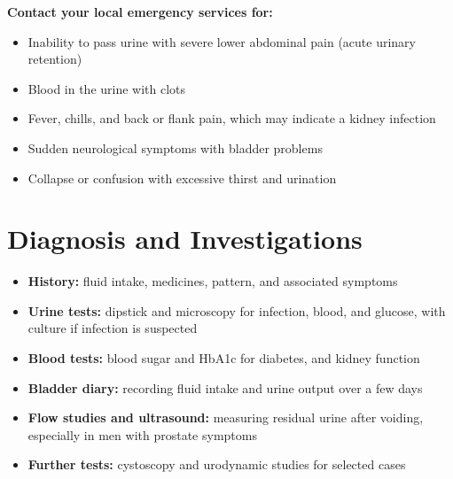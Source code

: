 \textbf{Contact your local emergency services for:}
\begin{itemize}
    \item Inability to pass urine with severe lower abdominal pain (acute urinary retention)
    \item Blood in the urine with clots
    \item Fever, chills, and back or flank pain, which may indicate a kidney infection
    \item Sudden neurological symptoms with bladder problems
    \item Collapse or confusion with excessive thirst and urination
\end{itemize}

\section*{Diagnosis and Investigations}
\begin{itemize}
    \item \textbf{History:} fluid intake, medicines, pattern, and associated symptoms
    \item \textbf{Urine tests:} dipstick and microscopy for infection, blood, and glucose, with culture if infection is suspected
    \item \textbf{Blood tests:} blood sugar and HbA1c for diabetes, and kidney function
    \item \textbf{Bladder diary:} recording fluid intake and urine output over a few days
    \item \textbf{Flow studies and ultrasound:} measuring residual urine after voiding, especially in men with prostate symptoms
    \item \textbf{Further tests:} cystoscopy and urodynamic studies for selected cases
\end{itemize}

